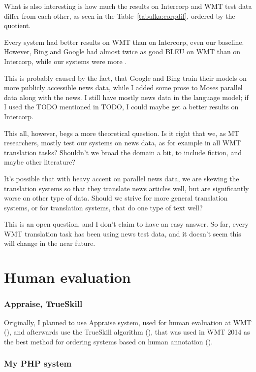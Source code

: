 What is also interesting is how much the results on Intercorp and WMT test data differ from each other, as seen in the Table~\ref{tabulka:corpdif}, ordered by the quotient.  

Every system had better results on WMT than on Intercorp, even our baseline. However, Bing and Google had almost twice as good BLEU on WMT than on Intercorp, while our systems were more .

This is probably caused by the fact, that Google and Bing train their models on more publicly accessible news data, while I added some prose to Moses parallel data along with the news. I still have mostly news data in the language model; if I used the TODO mentioned in TODO, I could maybe get a better results on Intercorp.

This all, however, begs a more theoretical question. 
Is it right that we, as MT researchers, mostly test our systems on news data, as for example in all WMT translation tasks? 
Shouldn't we broad the domain a bit, to include fiction, and maybe other literature? 

It's possible that with heavy accent on parallel news data, we are skewing the translation systems so that they translate news articles well, but are significantly worse on other type of data. Should we strive for more general translation systems, or for translation systems, that do one type of text well?

This is an open question, and I don't claim to have an easy answer. So far, every WMT translation task has been using news test data, and it doesn't seem this will change in the near future.

\section{Human evaluation}


\subsubsection{Appraise, TrueSkill}
Originally, I planned to use Appraise system, used for human evaluation at WMT (\cite{appraise}), and afterwards use the TrueSkill algorithm (\cite{trueskill}), that was used in WMT 2014 as the best method for ordering systems based on human annotation (\cite{wmt_findings_2014}). 

\subsubsection{My PHP system}

